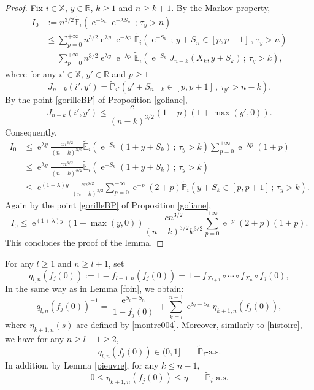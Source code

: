 \documentclass[12pt]{amsart}
\theoremstyle{definition}
\numberwithin{equation}{section}
\def\bb#1{\mathbb{#1}}
\def\tbb#1{\tilde{\mathbb{#1}}}
\def\geq{\geqslant}
\def\leq{\leqslant}
\renewcommand\ll{\lambda}
\DeclareMathOperator{\e}{e}
\begin{document}
\begin{proof}
Fix $i \in \bb X$, $y \in \bb R$, $k \geq 1$ and $n\geq k+1$. By the Markov property,
\begin{align*}
I_0 &:= n^{3/2} \tbb E_i \left( \e^{-S_k} \e^{-\ll S_n} \,;\, \tau_y > n \right) \\
&\leq \sum_{p=0}^{+\infty} n^{3/2} \e^{\ll y} \e^{-\ll p} \tbb E_i \left( \e^{-S_k} \,;\, y+S_n \in [p,p+1] \,,\, \tau_y > n \right) \\
&= \sum_{p=0}^{+\infty} n^{3/2} \e^{\ll y} \e^{-\ll p} \tbb E_i \left( \e^{-S_k} J_{n-k} \left( X_k, y+S_k \right) \,;\, \tau_y > k \right),
\end{align*}
where for any $i' \in \bb X$, $y' \in \bb R$ and $p \geq 1$
\[
J_{n-k} (i',y') = \tbb P_{i'} \left( y'+S_{n-k} \in [p,p+1] \,,\, \tau_{y'} > n-k \right).
\]
By the point \ref{gorilleBP} of Proposition \ref{goliane},
\[
J_{n-k} (i',y') \leq \frac{c}{(n-k)^{3/2}} (1+p)(1+\max(y',0)).
\]
Consequently,
\begin{align*}
I_0 &\leq \e^{\ll y} \frac{c n^{3/2}}{(n-k)^{3/2}} \tbb E_i \left( \e^{-S_k} \left( 1+y+S_k \right) \,;\, \tau_y > k \right) \sum_{p=0}^{+\infty} \e^{-\ll p} (1+p) \\
&\leq \e^{\ll y} \frac{c n^{3/2}}{(n-k)^{3/2}} \tbb E_i \left( \e^{-S_k} \left( 1+y+S_k \right) \,;\, \tau_y > k \right) \\
&\leq \e^{(1+\ll) y} \frac{c n^{3/2}}{(n-k)^{3/2}} \sum_{p=0}^{+\infty} \e^{-p}(2+p) \tbb P_i \left( y+S_k \in [p,p+1] \,;\, \tau_y > k \right).
\end{align*}
Again by the point \ref{gorilleBP} of Proposition \ref{goliane},
\[
I_0 \leq \e^{(1+\ll) y} (1+\max(y,0)) \frac{c n^{3/2}}{(n-k)^{3/2}k^{3/2}} \sum_{p=0}^{+\infty} \e^{-p}(2+p)(1+p). 
\]
This concludes the proof of the lemma. 
\end{proof}

For any $l \geq 1$ and $n \geq l+1$, set
\[
q_{l,n}\left( f_j(0) \right) := 1-f_{l+1,n}\left( f_j(0) \right) = 1-f_{X_{l+1}} \circ \cdots \circ f_{X_n} \circ f_j(0),
\]
In the same way as in Lemma \ref{foin}, we obtain:
\begin{equation}
	\label{noisette}
	q_{l,n}\left( f_j(0) \right)^{-1} = \frac{\e^{S_l-S_n}}{1-f_j(0)} + \sum_{k=l}^{n-1} \e^{S_l-S_k} \eta_{k+1,n}\left( f_j(0) \right),
\end{equation}
where $\eta_{k+1,n}(s)$ are defined by \eqref{montre004}. Moreover, similarly to \eqref{histoire}, we have for any $n \geq l+1 \geq 2$,
\begin{equation}
	\label{mouton}
	q_{l,n}\left( f_j(0) \right) \in (0,1] \qquad \tbb P_i\text{-a.s.}
\end{equation}
In addition, by Lemma \ref{pieuvre}, for any $k \leq n-1$,
\begin{equation}
\label{piscine}
0 \leq \eta_{k+1,n}\left( f_j(0) \right) \leq \eta \qquad \tbb P_i\text{-a.s.}
\end{equation}
\end{document}

